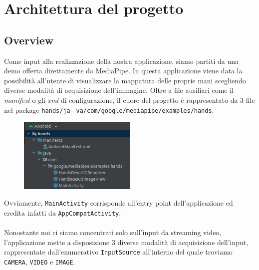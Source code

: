\chapter{Architettura del progetto}

\section{Overview}
Come input alla realizzazione della nostra applicazione, siamo partiti da una demo offerta direttamente da MediaPipe. In questa applicazione viene data la possibilità all'utente di visualizzare la mappatura delle proprie mani scegliendo diverse modalità di acquisizione dell'immagine.
Oltre a file ausiliari come il \textit{manifest} o gli \textit{xml} di configurazione, il cuore del progetto è rappresentato da 3 file nel package \texttt{hands/ja-} \texttt{va/com/google/mediapipe/examples/hands}.
\begin{figure}[H]
    \centering
    \includegraphics[width=0.5\textwidth]{images/struct_demo.png}
\end{figure}
\noindent Ovviamente, \texttt{MainActivity} corrisponde all'entry point dell'applicazione ed eredita infatti da \texttt{AppCompatActivity}.\\
\\
\noindent Nonostante noi ci siamo concentrati solo sull'input da streaming video, l'applicazione mette a disposizione 3 diverse modalità di acquisizione dell'input, rappresentate dall'enumerativo \texttt{InputSource} all'interno del quale troviamo \texttt{CAMERA}, \texttt{VIDEO} e \texttt{IMAGE}.\\


